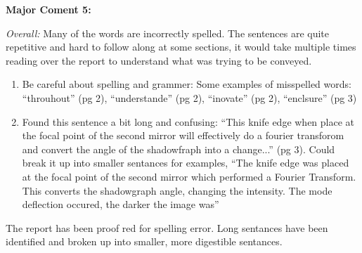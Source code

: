 \documentclass[%
 aip,
cp,  %
 amsmath,amssymb,
 reprint,%
]{revtex4-2}
\begin{document}
        \begin{mdframed} \textbf{Major Coment 5:}

            \textit{Overall:} Many of the words are incorrectly spelled. The sentences are quite repetitive and hard to follow along at some sections, it would take multiple times reading over the report to understand what was trying to be conveyed.

            \begin{enumerate}
                \item Be careful about spelling and grammer: Some examples of misspelled words: ``throuhout'' (pg 2), ``understande'' (pg 2), ``inovate'' (pg 2), “enclsure” (pg 3)
                \item Found this sentence a bit long and confusing: ``This knife edge when place at the focal point of the second mirror will effectively do a fourier transforom and convert the angle of the shadowfraph into a change...'' (pg 3). Could break it up into smaller sentances for examples, ``The knife edge was placed at the focal point of the second mirror which performed a Fourier Transform. This converts the shadowgraph angle, changing the intensity. The mode deflection occured, the darker the image was''
            \end{enumerate}
        \end{mdframed}
        {\color{red}
        
        The report has been proof red for spelling error. Long sentances have been identified and broken up into smaller, more digestible sentances.

        }
\end{document}
